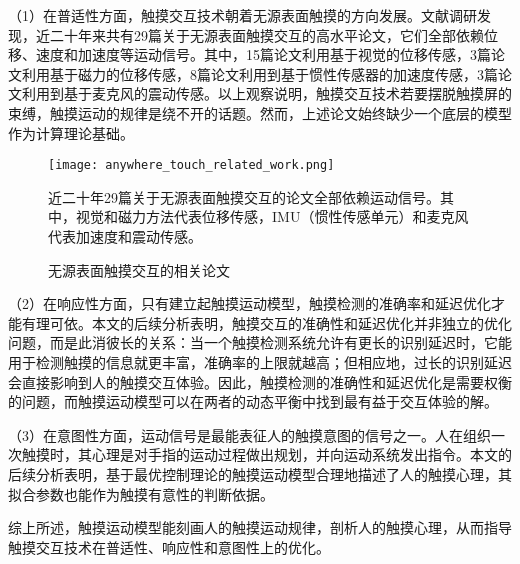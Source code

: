 （1）在普适性方面，触摸交互技术朝着无源表面触摸的方向发展。文献调研发现，近二十年来共有29篇关于无源表面触摸交互的高水平论文，它们全部依赖位移、速度和加速度等运动信号。其中，15篇论文利用基于视觉的位移传感\cite{harrison2011omnitouch, xiao2018mrtouch, paradiso2000sensor, agarwal2007high, chang2005real, letessier2004visual, sugita2008touch, grudin2001integrating, saba2012dante, xiao2016direct, benko2012miragetable, wilson2010combining, newcombe2011kinectfusion, mistry2011mouseless, xiao2013worldkit}，3篇论文利用基于磁力的位移传感\cite{chan2013fingerpad, chen2013utrack, parizi2019auraring}，8篇论文利用到基于惯性传感器的加速度传感\cite{gu2019accurate, shi2020ready, gu2020qwertyring, meier2021tapld, lam2002mids, oh2017anywheretouch, niikura2014anywhere, liu2020keep}，3篇论文利用到基于麦克风的震动传感\cite{chan2013fingerpad, chen2013utrack, parizi2019auraring}。以上观察说明，触摸交互技术若要摆脱触摸屏的束缚，触摸运动的规律是绕不开的话题。然而，上述论文始终缺少一个底层的模型作为计算理论基础。

\begin{figure}
	\centering
	\texttt{[image: anywhere\_touch\_related\_work.png]}
	\caption*{近二十年29篇关于无源表面触摸交互的论文全部依赖运动信号。其中，视觉和磁力方法代表位移传感，IMU（惯性传感单元）和麦克风代表加速度和震动传感。}
	\caption{无源表面触摸交互的相关论文}
	\label{fig:anywhere_touch_related_work}
\end{figure}

（2）在响应性方面，只有建立起触摸运动模型，触摸检测的准确率和延迟优化才能有理可依。本文的后续分析表明，触摸交互的准确性和延迟优化并非独立的优化问题，而是此消彼长的关系：当一个触摸检测系统允许有更长的识别延迟时，它能用于检测触摸的信息就更丰富，准确率的上限就越高；但相应地，过长的识别延迟会直接影响到人的触摸交互体验。因此，触摸检测的准确性和延迟优化是需要权衡的问题，而触摸运动模型可以在两者的动态平衡中找到最有益于交互体验的解。

（3）在意图性方面，运动信号是最能表征人的触摸意图的信号之一。人在组织一次触摸时，其心理是对手指的运动过程做出规划，并向运动系统发出指令。本文的后续分析表明，基于最优控制理论的触摸运动模型合理地描述了人的触摸心理，其拟合参数也能作为触摸有意性的判断依据。

综上所述，触摸运动模型能刻画人的触摸运动规律，剖析人的触摸心理，从而指导触摸交互技术在普适性、响应性和意图性上的优化。


